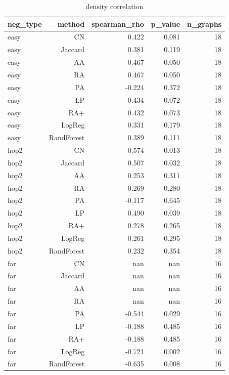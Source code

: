 \begin{table}[t]
\centering
\caption{density correlation}
\label{tab:density_correlation}
\begin{tabular}{lrrrr}
\hline
neg\_type & method & spearman\_rho & p\_value & n\_graphs \\
\hline
easy & CN & 0.422 & 0.081 & 18 \\
easy & Jaccard & 0.381 & 0.119 & 18 \\
easy & AA & 0.467 & 0.050 & 18 \\
easy & RA & 0.467 & 0.050 & 18 \\
easy & PA & -0.224 & 0.372 & 18 \\
easy & LP & 0.434 & 0.072 & 18 \\
easy & RA+ & 0.432 & 0.073 & 18 \\
easy & LogReg & 0.331 & 0.179 & 18 \\
easy & RandForest & 0.389 & 0.111 & 18 \\
hop2 & CN & 0.574 & 0.013 & 18 \\
hop2 & Jaccard & 0.507 & 0.032 & 18 \\
hop2 & AA & 0.253 & 0.311 & 18 \\
hop2 & RA & 0.269 & 0.280 & 18 \\
hop2 & PA & -0.117 & 0.645 & 18 \\
hop2 & LP & 0.490 & 0.039 & 18 \\
hop2 & RA+ & 0.278 & 0.265 & 18 \\
hop2 & LogReg & 0.261 & 0.295 & 18 \\
hop2 & RandForest & 0.232 & 0.354 & 18 \\
far & CN & nan & nan & 16 \\
far & Jaccard & nan & nan & 16 \\
far & AA & nan & nan & 16 \\
far & RA & nan & nan & 16 \\
far & PA & -0.544 & 0.029 & 16 \\
far & LP & -0.188 & 0.485 & 16 \\
far & RA+ & -0.188 & 0.485 & 16 \\
far & LogReg & -0.721 & 0.002 & 16 \\
far & RandForest & -0.635 & 0.008 & 16 \\
\hline
\end{tabular}
\end{table}